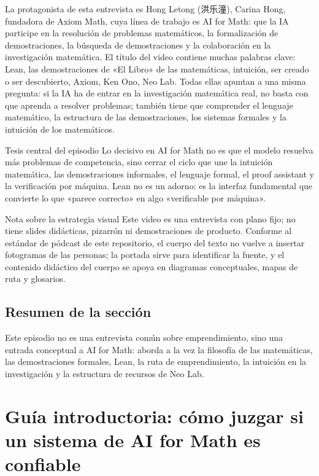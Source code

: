 \documentclass[a4paper]{article}
\begin{document}
La protagonista de esta entrevista es Hong Letong (洪乐潼), Carina Hong, fundadora de Axiom Math, cuya línea de trabajo es AI for Math: que la IA participe en la resolución de problemas matemáticos, la formalización de demostraciones, la búsqueda de demostraciones y la colaboración en la investigación matemática. El título del video contiene muchas palabras clave: Lean, las demostraciones de «El Libro» de las matemáticas, intuición, ser creado o ser descubierto, Axiom, Ken Ono, Neo Lab. Todas ellas apuntan a una misma pregunta: si la IA ha de entrar en la investigación matemática real, no basta con que aprenda a resolver problemas; también tiene que comprender el lenguaje matemático, la estructura de las demostraciones, los sistemas formales y la intuición de los matemáticos.

\begin{importantbox}{Tesis central del episodio}
Lo decisivo en AI for Math no es que el modelo resuelva más problemas de competencia, sino cerrar el ciclo que une la intuición matemática, las demostraciones informales, el lenguaje formal, el proof assistant y la verificación por máquina. Lean no es un adorno: es la interfaz fundamental que convierte lo que «parece correcto» en algo «verificable por máquina».
\end{importantbox}

\begin{knowledgebox}{Nota sobre la estrategia visual}
Este video es una entrevista con plano fijo; no tiene slides didácticas, pizarrón ni demostraciones de producto. Conforme al estándar de pódcast de este repositorio, el cuerpo del texto no vuelve a insertar fotogramas de las personas; la portada sirve para identificar la fuente, y el contenido didáctico del cuerpo se apoya en diagramas conceptuales, mapas de ruta y glosarios.
\end{knowledgebox}

\subsection{Resumen de la sección}

Este episodio no es una entrevista común sobre emprendimiento, sino una entrada conceptual a AI for Math: aborda a la vez la filosofía de las matemáticas, las demostraciones formales, Lean, la ruta de emprendimiento, la intuición en la investigación y la estructura de recursos de Neo Lab.
\section{Guía introductoria: cómo juzgar si un sistema de AI for Math es confiable}
\end{document}
